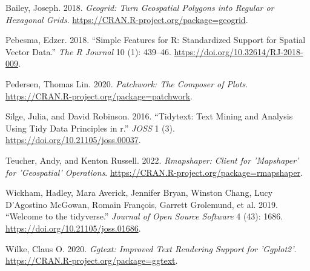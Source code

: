 \documentclass[
  11pt,
  letterpaper,
  DIV=11,
  numbers=noendperiod]{scrartcl}
\newlength{\cslhangindent}
\newenvironment{CSLReferences}[2] %
 {\begin{list}{}{%
  \setlength{\itemindent}{0pt}
  \setlength{\leftmargin}{0pt}
  \setlength{\parsep}{0pt}
  \ifodd #1
   \setlength{\leftmargin}{\cslhangindent}
   \setlength{\itemindent}{-1\cslhangindent}
  \fi
  \setlength{\itemsep}{#2\baselineskip}}}
 {\end{list}}
\begin{document}
\label{refs}
\begin{CSLReferences}{1}{0}
Bailey, Joseph. 2018. \emph{Geogrid: Turn Geospatial Polygons into
Regular or Hexagonal Grids}.
\url{https://CRAN.R-project.org/package=geogrid}.

Pebesma, Edzer. 2018. {``{Simple Features for R: Standardized Support
for Spatial Vector Data}.''} \emph{{The R Journal}} 10 (1): 439--46.
\url{https://doi.org/10.32614/RJ-2018-009}.

Pedersen, Thomas Lin. 2020. \emph{Patchwork: The Composer of Plots}.
\url{https://CRAN.R-project.org/package=patchwork}.

Silge, Julia, and David Robinson. 2016. {``Tidytext: Text Mining and
Analysis Using Tidy Data Principles in r.''} \emph{JOSS} 1 (3).
\url{https://doi.org/10.21105/joss.00037}.

Teucher, Andy, and Kenton Russell. 2022. \emph{Rmapshaper: Client for
'Mapshaper' for 'Geospatial' Operations}.
\url{https://CRAN.R-project.org/package=rmapshaper}.

Wickham, Hadley, Mara Averick, Jennifer Bryan, Winston Chang, Lucy
D'Agostino McGowan, Romain François, Garrett Grolemund, et al. 2019.
{``Welcome to the {tidyverse}.''} \emph{Journal of Open Source Software}
4 (43): 1686. \url{https://doi.org/10.21105/joss.01686}.

Wilke, Claus O. 2020. \emph{Ggtext: Improved Text Rendering Support for
'Ggplot2'}. \url{https://CRAN.R-project.org/package=ggtext}.

\end{CSLReferences}
\end{document}
